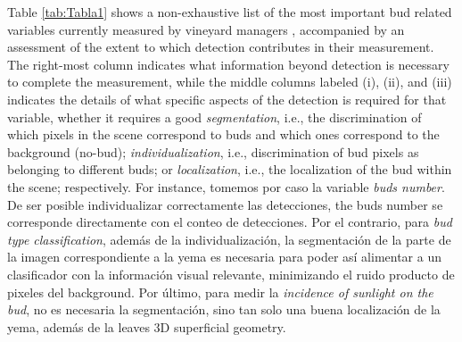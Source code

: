 \documentclass[a4paper,authoryear,review]{elsarticle}
\begin{document}
	Table \ref{tab:Tabla1} shows a non-exhaustive list of the most important bud related variables currently measured by vineyard managers \citep{sanchez2005bud, noyce2016basis, collins2020effects}, accompanied by an assessment of the extent to which detection contributes in their measurement. The right-most column indicates what information beyond detection  is necessary to complete the measurement, while the middle columns labeled (i), (ii), and (iii) indicates the details of what specific aspects of the detection is required for that variable, whether it requires a good  \emph{segmentation}, i.e., the discrimination of which pixels in the scene correspond to buds and which ones correspond to the background (no-bud); \emph{individualization}, i.e., discrimination of bud pixels as belonging to different buds; or \emph{localization}, i.e., the localization of the bud within the scene; respectively.
%
For instance, tomemos por caso la variable \emph{buds number}. De ser posible individualizar correctamente las detecciones, the buds number se corresponde directamente con el conteo de detecciones. Por el contrario, para \emph{bud type classification}, además de la individualización, la segmentación de la parte de la imagen correspondiente a la yema es necesaria para poder así alimentar a un clasificador con la información visual relevante, minimizando el ruido producto de pixeles del background. Por último, para medir la \emph{incidence of sunlight on the bud}, no es necesaria la segmentación, sino tan solo una buena localización de la yema, además de la leaves 3D superficial geometry. 


\end{document}
